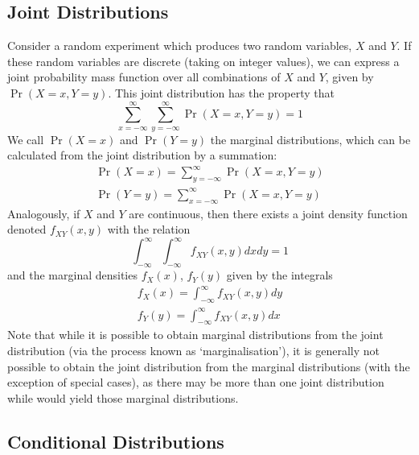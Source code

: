 \documentclass[11pt]{report} %
\begin{document}
\subsection{Joint Distributions}

Consider a random experiment which produces two random variables, $X$ and $Y$. If these random variables are discrete (taking on integer values), we can express a joint probability mass function over all combinations of $X$ and $Y$, given by $\operatorname{Pr}\left(X = x, Y = y\right)$. This joint distribution has the property that
\begin{equation}
\sum_{x = -\infty}^{\infty}\sum_{y = -\infty}^{\infty}\operatorname{Pr}\left(X = x, Y = y\right) = 1
\end{equation}
We call $\operatorname{Pr}\left(X = x\right)$ and $\operatorname{Pr}\left(Y = y\right)$ the marginal distributions, which can be calculated from the joint distribution by a summation:
\begin{gather}
\operatorname{Pr}\left(X = x\right) = \sum_{y = -\infty}^{\infty}\operatorname{Pr}\left(X = x, Y = y\right) \\
\operatorname{Pr}\left(Y = y\right) = \sum_{x = -\infty}^{\infty}\operatorname{Pr}\left(X = x, Y = y\right)
\end{gather}
Analogously, if $X$ and $Y$ are continuous, then there exists a joint density function denoted $f_{XY}\left(x, y\right)$ with the relation
\begin{equation}
\int_{-\infty}^{\infty}\int_{-\infty}^{\infty}f_{XY}\left(x, y\right)dxdy = 1
\end{equation}
and the marginal densities $f_{X}\left(x\right)$, $f_{Y}\left(y\right)$ given by the integrals
\begin{gather}
f_{X}\left(x\right) = \int_{-\infty}^{\infty}f_{XY}\left(x, y\right)dy \\
f_{Y}\left(y\right) = \int_{-\infty}^{\infty}f_{XY}\left(x, y\right)dx
\end{gather}
Note that while it is possible to obtain marginal distributions from the joint distribution (via the process known as `marginalisation'), it is generally not possible to obtain the joint distribution from the marginal distributions (with the exception of special cases), as there may be more than one joint distribution while would yield those marginal distributions.

\subsection{Conditional Distributions}
\end{document}
